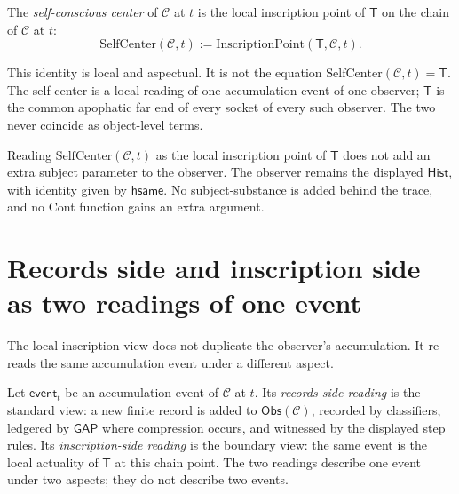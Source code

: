 \begin{definition}
\label{def:apophatic-fixed-point-self-center}
The \emph{self-conscious center} of $\mathcal{C}$ at $t$ is the local inscription point of $\mathsf{T}$ on the chain of $\mathcal{C}$ at $t$:
$$
\mathrm{SelfCenter}(\mathcal{C}, t) := \mathrm{InscriptionPoint}(\mathsf{T}, \mathcal{C}, t).
$$
\end{definition}

This identity is local and aspectual. It is not the equation $\mathrm{SelfCenter}(\mathcal{C}, t) = \mathsf{T}$. The self-center is a local reading of one accumulation event of one observer; $\mathsf{T}$ is the common apophatic far end of every socket of every such observer. The two never coincide as object-level terms.

\begin{principle}
\label{prin:apophatic-fixed-point-no-substance}
Reading $\mathrm{SelfCenter}(\mathcal{C}, t)$ as the local inscription point of $\mathsf{T}$ does not add an extra subject parameter to the observer. The observer remains the displayed $\mathsf{Hist}$, with identity given by $\mathsf{hsame}$. No subject-substance is added behind the trace, and no Cont function gains an extra argument.
\end{principle}

\section{Records side and inscription side as two readings of one event}
\label{sec:apophatic-fixed-point-two-readings}

The local inscription view does not duplicate the observer's accumulation. It re-reads the same accumulation event under a different aspect.

\begin{definition}
\label{def:apophatic-fixed-point-two-aspect}
Let $\mathsf{event}_t$ be an accumulation event of $\mathcal{C}$ at $t$. Its \emph{records-side reading} is the standard view: a new finite record is added to $\mathsf{Obs}(\mathcal{C})$, recorded by classifiers, ledgered by $\mathsf{GAP}$ where compression occurs, and witnessed by the displayed step rules. Its \emph{inscription-side reading} is the boundary view: the same event is the local actuality of $\mathsf{T}$ at this chain point. The two readings describe one event under two aspects; they do not describe two events.
\end{definition}

